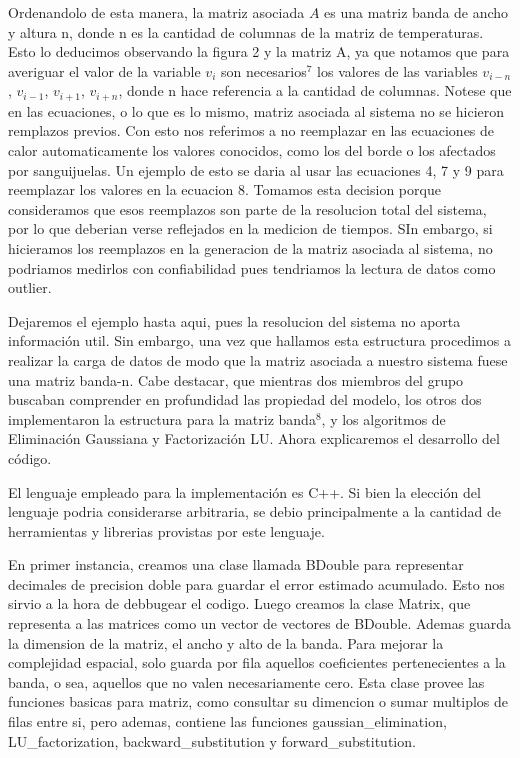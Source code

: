 Ordenandolo de esta manera, la matriz asociada $A$ es una matriz banda de ancho y altura n, donde n es la cantidad de columnas 
de la matriz de temperaturas. Esto lo deducimos observando la figura 2 y la matriz A,
ya que notamos que para averiguar el valor de la variable $v_{i}$ son necesarios$^7$ los valores de las variables $v_{i-n}$, $v_{i-1}$, 
$v_{i+1}$, $v_{i+n}$, donde n hace referencia a la cantidad de columnas.
Notese que en las ecuaciones, o lo que es lo mismo, matriz asociada al sistema no se hicieron remplazos previos. Con esto nos referimos a no reemplazar
 en las ecuaciones de calor automaticamente los valores conocidos, como los del borde o los afectados por sanguijuelas. Un ejemplo de esto se daria 
 al usar las ecuaciones 4, 7 y 9 para reemplazar los valores en la ecuacion 8. Tomamos esta decision porque consideramos que esos reemplazos son parte
 de la resolucion total del sistema, por lo que deberian verse reflejados en la medicion de tiempos. SIn embargo, si hicieramos los reemplazos 
 en la generacion de la matriz asociada al sistema, no podriamos medirlos con confiabilidad pues tendriamos la lectura de datos como outlier.

Dejaremos el ejemplo hasta aqui, pues la resolucion del sistema no aporta informaci\'on util. Sin embargo, una vez que hallamos esta estructura 
procedimos a realizar la carga de datos de modo que la matriz asociada a nuestro sistema fuese una matriz banda-n. Cabe destacar, que mientras dos 
miembros del grupo buscaban comprender en profundidad las propiedad del modelo, los otros dos implementaron la estructura para la matriz banda$^8$,
y los algoritmos de Eliminaci\'on Gaussiana y Factorizaci\'on LU. Ahora explicaremos el desarrollo del c\'odigo.

El lenguaje empleado para la implementaci\'on es C++. Si bien la elecci\'on del lenguaje podria considerarse arbitraria, se debio principalmente a la 
cantidad de herramientas y librerias provistas por este lenguaje. 

En primer instancia, creamos una clase llamada BDouble para representar decimales de
precision doble para guardar el error estimado acumulado. Esto nos sirvio a la hora de debbugear el codigo.
Luego creamos la clase Matrix, que representa a las matrices como un vector de vectores de BDouble. 
Ademas guarda la dimension de la matriz, el ancho y alto de la banda. Para mejorar la complejidad espacial, solo guarda por fila aquellos
coeficientes pertenecientes a la banda, o sea, aquellos que no valen necesariamente cero. Esta clase provee las funciones basicas para matriz, como 
consultar su dimencion o sumar multiplos de filas entre si, pero ademas, contiene las funciones gaussian\_elimination, LU\_factorization, backward\_substitution y 
forward\_substitution. 

